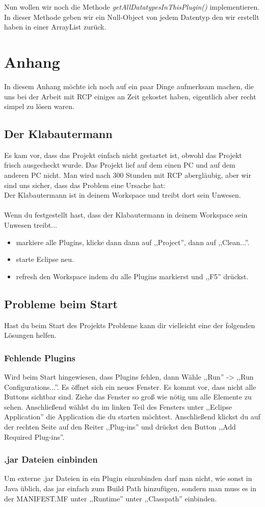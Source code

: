 \documentclass[10pt,a4paper]{article}
\begin{document}
Nun wollen wir noch die Methode \emph{getAllDatatypesInThisPlugin()} implementieren.
In dieser Methode geben wir ein Null-Object von jedem Datentyp den wir erstellt haben in einer ArrayList zurück.



\section{Anhang}
In diesem Anhang möchte ich noch auf ein paar Dinge aufmerksam machen, die uns bei der Arbeit mit RCP einiges an Zeit gekostet haben, eigentlich aber recht simpel zu lösen waren.
\subsection{Der Klabautermann}
Es kam vor, dass das Projekt einfach nicht gestartet ist, obwohl das Projekt frisch ausgecheckt wurde. Das Projekt lief auf dem einen PC und auf dem anderen PC nicht. Man wird nach 300 Stunden mit RCP abergläubig, aber wir sind uns sicher, dass das Problem eine Ursache hat: \\
Der Klabautermann ist in deinem Workspace und treibt dort sein Unwesen.\\
\\
Wenn du festgestellt hast, dass der Klabautermann in deinem Workspace sein Unwesen treibt...
\begin{itemize}
\item markiere alle Plugins, klicke dann dann auf ,,Project'',  dann auf ,,Clean...''.
\item starte Eclipse neu.
\item refresh den Workspace indem du alle Plugins markierst und ,,F5'' drückst.  
\end{itemize}
\subsection{Probleme beim Start}
Hast du beim Start des Projekts Probleme kann dir vielleicht eine der folgenden Lösungen helfen.

\subsubsection{Fehlende Plugins}
Wird beim Start hingewiesen, dass Plugins fehlen, dann Wähle ,,Run'' -> ,,Run Configurations...''. Es öffnet sich ein neues Fenster. Es kommt vor, dass nicht alle Buttons sichtbar sind. Ziehe das Fenster so groß wie nötig um alle Elemente zu sehen. Anschließend wählst du im linken Teil des Fensters unter ,,Eclipse Application'' die Application die du starten möchtest. Anschließend klickst du auf der rechten Seite auf den Reiter ,,Plug-ins'' und drückst den Button ,,Add Required Plug-ins''. 
\subsubsection{.jar Dateien einbinden}
Um externe .jar Dateien in ein Plugin einzubinden darf man nicht, wie sonst in Java üblich, das jar einfach zum Build Path hinzufügen, sondern man muss es in der MANIFEST.MF unter ,,Runtime'' unter ,,Classpath'' einbinden.

\printindex
\end{document}
